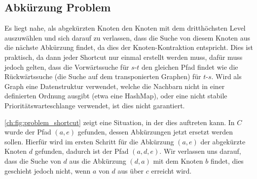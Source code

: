 \subsection{Abkürzung Problem}

Es liegt nahe, als abgekürzten Knoten den Knoten mit dem dritthöchsten Level auszuwählen und sich darauf zu verlassen, dass die Suche von diesem Knoten aus die nächste Abkürzung findet, da dies der Knoten-Kontraktion entspricht.
Dies ist praktisch, da dann jeder Shortcut nur einmal erstellt werden muss, dafür muss jedoch gelten, dass die Vorwärtssuche für $s$-$t$ den gleichen Pfad findet wie die Rückwärtssuche (die Suche auf dem transponierten Graphen) für $t$-$s$.
Wird als Graph eine Datenstruktur verwendet, welche die Nachbarn nicht in einer definierten Ordnung ausgibt (etwa eine HashMap), oder eine nicht stabile Prioritätswarteschlange verwendet, ist dies nicht garantiert.

\autoref{ch:fig:problem_shortcut} zeigt eine Situation, in der dies auftreten kann.
In $C$ wurde der Pfad $(a, e)$ gefunden, dessen Abkürzungen jetzt ersetzt werden sollen.
Hierfür wird im ersten Schritt für die Abkürzung $(a, e)$ der abgekürzte Knoten $d$ gefunden, dadurch ist der Pfad $(a, d, e)$.
Wir verlassen uns darauf, dass die Suche von $d$ aus die Abkürzung $(d, a)$ mit dem Knoten $b$ findet, dies geschieht jedoch nicht, wenn $a$ von $d$ aus über $c$ erreicht wird.

